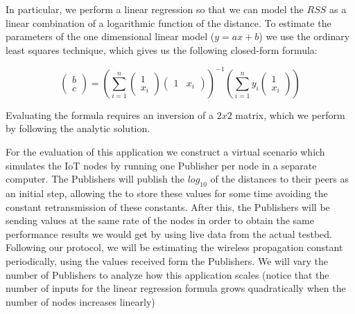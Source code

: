 In particular, we perform a linear regression so that we can model the $RSS$ as
a linear combination of a logarithmic function of the distance.  To estimate
the parameters of the one dimensional linear model ($y = ax + b$) we use the
ordinary least squares technique, which gives us the following closed-form
formula:

\[
\begin{pmatrix} b \\ c \end{pmatrix} =
\left( \sum_{i=1}^n \begin{pmatrix} 1 \\ x_i \end{pmatrix}
  \begin{pmatrix} 1 & x_i\end{pmatrix}\right)^{-1}
\left( \sum_{i=1}^n y_i \begin{pmatrix} 1 \\ x_i \end{pmatrix}\right)
\]

Evaluating the formula requires an inversion of a $2 x 2$ matrix, which we perform
by following the analytic solution.

For the evaluation of this application we construct a virtual scenario which
simulates the IoT nodes by running one Publisher per node in a separate
computer.  The Publishers will publish the $log_{10}$ of the distances to their
peers as an initial step, allowing the \broker to store these values for some
time avoiding the constant retransmission of these constants.  After this, the
Publishers will be sending values at the same rate of the nodes in order to
obtain the same performance results we would get by using live data from the
actual testbed.  Following our protocol, we will be estimating the wireless
propagation constant periodically, using the values received form the
Publishers.  We will vary the number of Publishers to analyze how this
application scales (notice that the number of inputs for the linear regression
formula grows quadratically when the number of nodes increases linearly)

